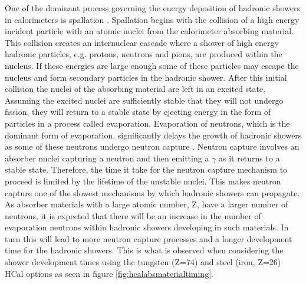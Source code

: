 
One of the dominant process governing the energy deposition of hadronic showers in calorimeters is spallation \cite{Wigmans:2000vf}.  Spallation begins with the collision of a high energy incident particle with an atomic nuclei from the calorimeter absorbing material.  This collision creates an internuclear cascade where a shower of high energy hadronic particles, e.g. protons, neutrons and pions, are produced within the nucleus.  If these energies are large enough some of these particles may escape the nucleus and form secondary particles in the hadronic shower.  After this initial collision the nuclei of the absorbing material are left in an excited state.  Assuming the excited nuclei are sufficiently stable that they will not undergo fission, they will return to a stable state by ejecting energy in the form of particles in a process called evaporation.  Evaporation of neutrons, which is the dominant form of evaporation, significantly delays the growth of hadronic showers as some of these neutrons undergo neutron capture \cite{Adloff:2014rya}.  Neutron capture involves an absorber nuclei capturing a neutron and then emitting a $\gamma$ as it returns to a stable state.  Therefore, the time it take for the neutron capture mechanism to proceed is limited by the lifetime of the unstable nuclei.  This makes neutron capture one of the slowest mechanisms by which hadronic showers can propagate.  As absorber materials with a large atomic number, Z, have a larger number of neutrons, it is expected that there will be an increase in the number of evaporation neutrons within hadronic showers developing in such materials.  In turn this will lead to more neutron capture processes and a longer development time for the hadronic showers.  This is what is observed when considering the shower development times using the tungsten (Z=74) and steel (iron, Z=26) HCal options as seen in figure \ref{fig:hcalabsmaterialtiming}. 


